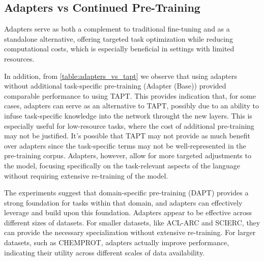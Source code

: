 \documentclass[draft,10pt,twocolumn,letterpaper]{article}
\begin{document}
\subsection{Adapters vs Continued Pre-Training} Adapters serve as both a complement to traditional fine-tuning and as a standalone alternative, offering targeted task optimization while reducing computational costs, which is especially beneficial in settings with limited resources.

In addition, from \ref{table:adapters_vs_tapt} we observe that using adapters without additional task-specific pre-training (Adapter (Base)) provided comparable performance to using TAPT. This provides indication that, for some cases, adapters can serve as an alternative to TAPT, possibly due to an ability to infuse task-specific knowledge into the network throught the new layers. This is especially useful for low-resource tasks, where the cost of additional pre-training may not be justified. It's possible that TAPT may not provide as much benefit over adapters since the task-specific terms may not be well-represented in the pre-training corpus. Adapters, however, allow for more targeted adjustments to the model, focusing specifically on the task-relevant aspects of the language without requiring extensive re-training of the model.

The experiments suggest that domain-specific pre-training (DAPT) provides a strong foundation for tasks within that domain, and adapters can effectively leverage and build upon this foundation. Adapters appear to be effective across different sizes of datasets. For smaller datasets, like ACL-ARC and SCIERC, they can provide the necessary specialization without extensive re-training. For larger datasets, such as CHEMPROT, adapters actually improve performance, indicating their utility across different scales of data availability.
\end{document}
